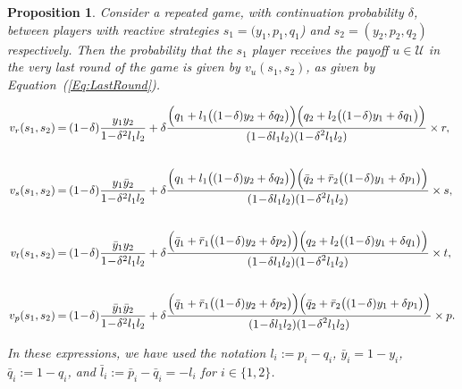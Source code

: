 \documentclass[11pt]{article}
\theoremstyle{plainCl1}
\newtheorem{Prop}{Proposition}
\theoremstyle{plainCl2}
\begin{document}
\begin{Prop}\label{proposition:last_round} Consider a repeated game, with
    continuation probability $\delta$, between players with reactive strategies
    $s_1\!=\!(y_1, p_1, q_1$)  and $s_2\!=\!(y_2,p_2,q_2)$ respectively. Then
    the probability that the $s_1$ player receives the payoff $u\!\in\!
    \mathcal{U}$ in the very last round of the game is given by
    $v_{u}(s_1,s_2)$, as given by Equation~(\ref{Eq:LastRound}).

    \begin{equation} \label{Eq:LastRound}
      \setlength{\arraycolsep}{1pt}
      \begin{array}{rcl}
    
      v_{r}(s_1,s_2) &= &\displaystyle (1\!-\!\delta)\frac{y_1y_2}{1\!-\!\delta^2 l_1 l_2}+\delta \frac{\Big(q_1+l_1\big((1\!-\!\delta)y_2+\delta q_2\big)\Big) \Big(q_2+l_2\big((1\!-\!\delta)y_1+\delta q_1\big)\Big)}
      {\displaystyle(1\!-\!\delta l_1l_2)(1\!-\!\delta^2 l_1 l_2)} \times r,\\[1cm]
    
      v_{s}(s_1,s_2) &= &\displaystyle (1\!-\!\delta)\frac{y_1\bar{y}_2}{1\!-\!\delta^2 l_1 l_2}+\delta \frac{\Big(q_1+l_1\big((1\!-\!\delta)y_2+\delta q_2\big)\Big) \Big(\bar{q}_2+\bar{r}_2\big((1\!-\!\delta)y_1+\delta p_1\big)\Big)}
      {\displaystyle(1\!-\!\delta l_1l_2)(1\!-\!\delta^2 l_1 l_2)} \times s,\\[1cm]
    
      v_{t}(s_1,s_2) &= &\displaystyle (1\!-\!\delta)\frac{\bar{y}_1y_2}{1\!-\!\delta^2 l_1 l_2}+\delta \frac{\Big(\bar{q}_1+\bar{r}_1\big((1\!-\!\delta)y_2+\delta p_2\big)\Big) \Big(q_2+l_2\big((1\!-\!\delta)y_1+\delta q_1\big)\Big)}
      {\displaystyle(1\!-\!\delta l_1l_2)(1\!-\!\delta^2 l_1 l_2)} \times t,\\[1cm]
    
      v_{p}(s_1,s_2) &= &\displaystyle (1\!-\!\delta)\frac{\bar{y}_1\bar{y}_2}{1\!-\!\delta^2 l_1 l_2}+\delta \frac{\Big(\bar{q}_1+\bar{r}_1\big((1\!-\!\delta)y_2+\delta p_2\big)\Big) \Big(\bar{q}_2+\bar{r}_2\big((1\!-\!\delta)y_1+\delta p_1\big)\Big)}
      {\displaystyle(1\!-\!\delta l_1l_2)(1\!-\!\delta^2 l_1 l_2)} \times p.
      \end{array}
    \end{equation}

In these expressions, we have used the notation $l_i:=p_i\!-\!q_i$,
$\bar{y}_i\!=\!1\!-\!y_i$, $\bar{q}_i:=1\!-\!q_i$, and
$\bar{l}_i:=\bar{p}_i\!-\!\bar{q}_i=-l_i$ for $i\!\in\!\{1,2\}$.
\end{Prop}
\end{document}
